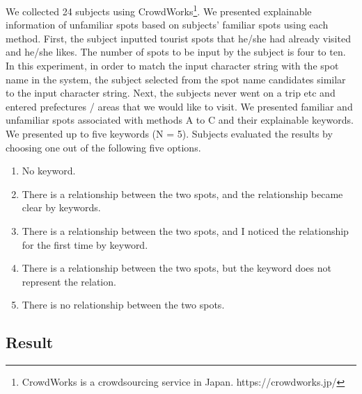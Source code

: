 \documentclass[journal]{IAENGtran}
\begin{document}
We collected 24 subjects using CrowdWorks\footnote{CrowdWorks is a crowdsourcing service in Japan. https://crowdworks.jp/}.
We presented explainable information of unfamiliar spots based on subjects' familiar spots using each method.
First, the subject inputted tourist spots that he/she had already visited and he/she likes. The number of spots to be input by the subject is four to ten.
In this experiment, in order to match the input character string with the spot name in the system, the subject selected from the spot name candidates similar to the input character string.
Next, the subjects never went on a trip etc and entered prefectures / areas that we would like to visit.
We presented familiar and unfamiliar spots associated with methods A to C and their explainable keywords.
We presented up to five keywords (N = 5).
Subjects evaluated the results by choosing one out of the following five options.
\begin{enumerate}
  \item No keyword.
  \item There is a relationship between the two spots, and the relationship became clear by keywords.
  \item There is a relationship between the two spots, and I noticed the relationship for the first time by keyword.
  \item There is a relationship between the two spots, but the keyword does not represent the relation.
  \item There is no relationship between the two spots.
\end{enumerate}

\subsection{Result}
\label{subsec:Result}
\end{document}
